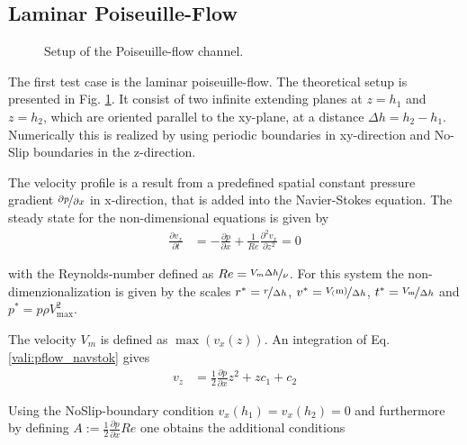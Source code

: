 \subsection{Laminar Poiseuille-Flow}

\begin{figure}[!bp]
  \begin{minipage}[c]{0.6\textwidth}
      \centering
  \end{minipage}
  \begin{minipage}[c]{0.3\textwidth}
      \caption{Setup of the Poiseuille-flow channel.
      \label{validation:setup_pf}
      }
  \end{minipage}
\end{figure}

The first test case is the laminar poiseuille-flow. The theoretical setup is presented in Fig. \ref{validation:setup_pf}.
It consist of two infinite extending  planes at $z=h_1$ and $z=h_2$, which are oriented
parallel to the xy-plane, at a distance $\Delta h = h_2 - h_1$.
Numerically this is realized by using periodic boundaries in xy-direction and
No-Slip boundaries in the z-direction.

The velocity profile is a result from a predefined spatial constant pressure gradient $\nicefrac{\partial p}{\partial x}$
 in x-direction, that is added into the Navier-Stokes equation.
The steady state for the non-dimensional equations is given by \citep{}
\begin{align}
    \label{vali:pflow_navstok}
    \frac{\partial v_x}{\partial t} &= - \frac{\partial p}{\partial x}
     + \frac{1}{Re} \frac{\partial^2 v_x}{\partial z^2} = 0
\end{align}

with the Reynolds-number defined as $Re = \nicefrac{V_{m}\Delta h}{\nu}$.
For this system the non-dimenzionalization is given by the scales
    $r^* = \nicefrac{r}{\Delta h}$, $v^*=\nicefrac{V_(\text{m})}{\Delta h}$,
    $t^* = \nicefrac{V_{\text{m}}}{\Delta h}$ and $p^* = p \rho V_{\text{max}}^2$.

\clearpage
The velocity $V_m$ is defined as $\max(v_x(z))$.
An integration of Eq. \ref{vali:pflow_navstok} gives
\begin{align}
v_z &= \frac{1}{2}\frac{\partial p}{\partial x}z^2 + zc_1 + c_2
\end{align}

Using the NoSlip-boundary condition $v_x(h_1) = v_x(h_2) = 0$ and furthermore by defining
$A:=\frac{1}{2}\frac{\partial p}{\partial x} Re$ one obtains the additional conditions


